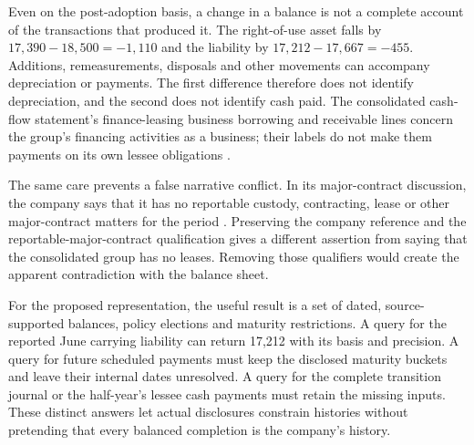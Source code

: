 Even on the post-adoption basis, a change in a balance is not a complete
account of the transactions that produced it. The right-of-use asset falls
by $17{,}390-18{,}500=-1{,}110$ and the liability by
$17{,}212-17{,}667=-455$. Additions, remeasurements, disposals and other
movements can accompany depreciation or payments. The first difference
therefore does not identify depreciation, and the second does not identify
cash paid. The consolidated cash-flow statement's finance-leasing business
borrowing and receivable lines concern the group's financing activities as
a business; their labels do not make them payments on its own lessee
obligations \citep[pp.\ 106--107]{pingan2019asbe}.

The same care prevents a false narrative conflict. In its major-contract
discussion, the company says that it has no reportable custody, contracting,
lease or other major-contract matters for the period
\citep[p.\ 86]{pingan2019asbe}. Preserving the company reference and
the reportable-major-contract qualification gives a different assertion
from saying that the consolidated group has no leases. Removing those
qualifiers would create the apparent contradiction with the balance sheet.

For the proposed representation, the useful result is a set of dated,
source-supported balances, policy elections and maturity restrictions.
A query for the reported June carrying liability can return 17,212 with
its basis and precision. A query for future scheduled payments must keep
the disclosed maturity buckets and leave their internal dates unresolved.
A query for the complete transition journal or the half-year's lessee cash
payments must retain the missing inputs. These distinct answers let actual
disclosures constrain histories without pretending that every balanced
completion is the company's history.

